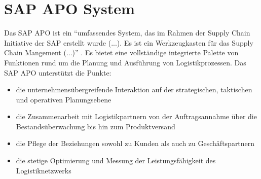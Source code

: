 \chapter{SAP APO System}
Das SAP \ac{APO} ist ein "`umfassendes  System, das im Rahmen der Supply Chain Initiative der SAP erstellt wurde (...). Es ist ein Werkzeugkasten für das Supply Chain Mangement (...)"' \cite[Abschnitt 4, Seite 5]{scm:script_17_1}. Es bietet eine vollständige integrierte Palette von Funktionen rund um die Planung und Ausführung von Logistikprozessen. Das SAP APO unterstützt die Punkte: \cite{scm:apo_2}
\begin{itemize}
	\item die unternehmensübergreifende Interaktion auf der strategischen, taktischen und operativen Planungsebene
	\item die Zusammenarbeit mit Logistikpartnern von der Auftragsannahme über die Bestandsüberwachung bis hin zum Produktversand
	\item die Pflege der Beziehungen sowohl zu Kunden als auch zu Geschäftspartnern
	\item die stetige Optimierung und Messung der Leistungsfähigkeit des Logistiknetzwerks
\end{itemize}

